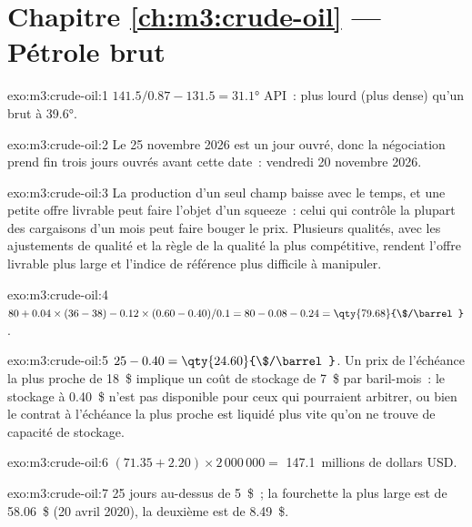 \section*{Chapitre \ref{ch:m3:crude-oil} --- Pétrole brut}

\begin{solution}{exo:m3:crude-oil:1}
$141.5/0.87 - 131.5 = 31.1$° API~: plus lourd (plus dense) qu'un brut à 39.6°.
\end{solution}

\begin{solution}{exo:m3:crude-oil:2}
Le 25 novembre 2026 est un jour ouvré, donc la négociation prend fin trois jours ouvrés
avant cette date~: vendredi 20 novembre 2026.
\end{solution}

\begin{solution}{exo:m3:crude-oil:3}
La production d'un seul champ baisse avec le temps, et une petite offre livrable peut
faire l'objet d'un squeeze~: celui qui contrôle la plupart des cargaisons d'un mois peut faire bouger le prix. Plusieurs qualités,
avec les ajustements de qualité et la règle de la qualité la plus compétitive, rendent l'offre
livrable plus large et l'indice de référence plus difficile à manipuler.
\end{solution}

\begin{solution}{exo:m3:crude-oil:4}
$80 + 0.04 \times (36 - 38) - 0.12 \times (0.60 - 0.40)/0.1 = 80 - 0.08 - 0.24 =
\qty{79.68}{\$/\barrel}$.
\end{solution}

\begin{solution}{exo:m3:crude-oil:5}
$25 - 0.40 = \qty{24.60}{\$/\barrel}$. Un prix de l'échéance la plus proche de 18~\$ implique un coût de stockage de
7~\$ par baril-mois~: le stockage à 0.40~\$ n'est pas disponible pour ceux qui pourraient arbitrer,
ou bien le contrat à l'échéance la plus proche est liquidé plus vite qu'on ne trouve de capacité de stockage.
\end{solution}

\begin{solution}{exo:m3:crude-oil:6}
$(71.35 + 2.20) \times 2\,000\,000 = $ 147.1~millions de dollars USD.
\end{solution}

\begin{solution}{exo:m3:crude-oil:7}
25 jours au-dessus de 5~\$~; la fourchette la plus large est de 58.06~\$ (20 avril 2020), la
deuxième est de 8.49~\$.
\end{solution}

